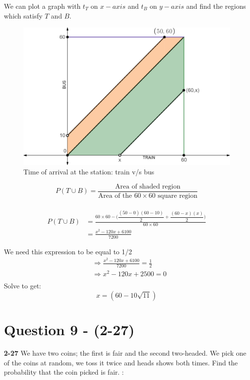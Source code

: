 \documentclass{article}
\begin{document}
We can plot a graph with $t_T$ on $x-axis$ and $t_B$ on $y-axis$ and find the regions which satisfy $T$ and $B$.
\begin{figure}[H]
    \centering
    \includegraphics[width=0.8\linewidth]{pics/bustrain.png}
    \caption{Time of arrival at the station: train v/s bus}
    \label{fig:my_label}
\end{figure}
    $$P(T\cup B) = \frac{\text{Area of shaded region}}{\text{Area of the } 60 \times 60 \text{ square region}}$$\\
\begin{align*}
    P(T\cup B) &= \frac{60\times 60 - \Big(\dfrac{(50-0)(60-10)}{2}+\dfrac{(60-x)(x)}{2}\Big)}{60\times 60}\\
    &=\frac{x^2 - 120x + 6100}{7200}
\end{align*}

We need this expression to be equal to 1/2\\
\begin{align*}
    &\Rightarrow \frac{x^2 - 120x + 6100}{7200}=\frac{1}{2}\\
&\Rightarrow x^2 - 120x + 2500 = 0\\
\end{align*}
Solve to get:
$$x = (60 - 10\sqrt{11})$$ 
\section{Question 9 - (2-27)}
\label{Q9}
\textbf{2-27} We have two coins; the first is fair and the second two-headed. We pick one of the coins at random, we toss it twice and heads shows both times. Find the probability that the coin picked is fair.  : \\
\end{document}
